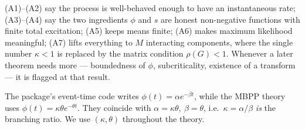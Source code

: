 \begin{intuition}
(A1)--(A2) say the process is well-behaved enough to have an instantaneous rate;
(A3)--(A4) say the two ingredients $\phi$ and $s$ are honest non-negative
functions with finite total excitation; (A5) keeps means finite; (A6) makes
maximum likelihood meaningful; (A7) lifts everything to $M$ interacting
components, where the single number $\kappa<1$ is replaced by the matrix condition
$\rho(G)<1$. Whenever a later theorem needs more --- boundedness of $\phi$,
subcriticality, existence of a transform --- it is flagged at that result.
\end{intuition}

\begin{remark}
The package's event-time code writes $\phi(t)=\alpha e^{-\beta t}$, while the MBPP
theory uses $\phi(t)=\kappa\theta e^{-\theta t}$. They coincide with
$\alpha=\kappa\theta,\ \beta=\theta$, i.e.\ $\kappa=\alpha/\beta$ \emph{is} the
branching ratio. We use $(\kappa,\theta)$ throughout the theory.
\end{remark}
